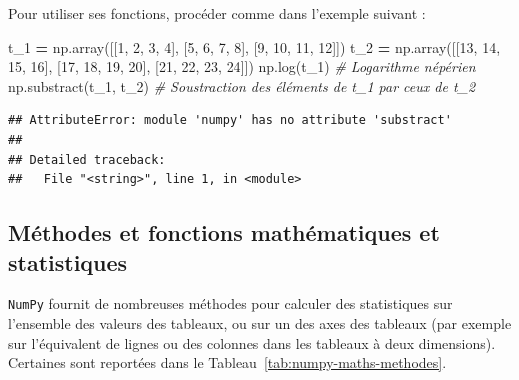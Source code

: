 \documentclass[12pt,]{book}
\newenvironment{Shaded}{\begin{snugshade}}{\end{snugshade}}
\newcommand{\DecValTok}[1]{\textcolor[rgb]{0.00,0.00,0.81}{#1}}
\newcommand{\CommentTok}[1]{\textcolor[rgb]{0.56,0.35,0.01}{\textit{#1}}}
\newcommand{\OperatorTok}[1]{\textcolor[rgb]{0.81,0.36,0.00}{\textbf{#1}}}
\newcommand{\NormalTok}[1]{#1}
\numberwithin{equation}{section}
\numberwithin{countremarque}{section}
\begin{document}
Pour utiliser ses fonctions, procéder comme dans l'exemple suivant :

\begin{Shaded}
\begin{Highlighting}[]
\NormalTok{t_1 }\OperatorTok{=}\NormalTok{ np.array([[}\DecValTok{1}\NormalTok{, }\DecValTok{2}\NormalTok{, }\DecValTok{3}\NormalTok{, }\DecValTok{4}\NormalTok{], [}\DecValTok{5}\NormalTok{, }\DecValTok{6}\NormalTok{, }\DecValTok{7}\NormalTok{, }\DecValTok{8}\NormalTok{], [}\DecValTok{9}\NormalTok{, }\DecValTok{10}\NormalTok{, }\DecValTok{11}\NormalTok{, }\DecValTok{12}\NormalTok{]])}
\NormalTok{t_2 }\OperatorTok{=}\NormalTok{ np.array([[}\DecValTok{13}\NormalTok{, }\DecValTok{14}\NormalTok{, }\DecValTok{15}\NormalTok{, }\DecValTok{16}\NormalTok{], [}\DecValTok{17}\NormalTok{, }\DecValTok{18}\NormalTok{, }\DecValTok{19}\NormalTok{, }\DecValTok{20}\NormalTok{], [}\DecValTok{21}\NormalTok{, }\DecValTok{22}\NormalTok{, }\DecValTok{23}\NormalTok{, }\DecValTok{24}\NormalTok{]])}
\NormalTok{np.log(t_1) }\CommentTok{# Logarithme népérien}
\NormalTok{np.substract(t_1, t_2) }\CommentTok{# Soustraction des éléments de t_1 par ceux de t_2}
\end{Highlighting}
\end{Shaded}

\begin{lstlisting}
## AttributeError: module 'numpy' has no attribute 'substract'
## 
## Detailed traceback: 
##   File "<string>", line 1, in <module>
\end{lstlisting}

\subsection{Méthodes et fonctions mathématiques et
statistiques}\label{methodes-et-fonctions-mathematiques-et-statistiques}

\texttt{NumPy} fournit de nombreuses méthodes pour calculer des
statistiques sur l'ensemble des valeurs des tableaux, ou sur un des axes
des tableaux (par exemple sur l'équivalent de lignes ou des colonnes
dans les tableaux à deux dimensions). Certaines sont reportées dans le
Tableau~\ref{tab:numpy-maths-methodes}.
\end{document}
